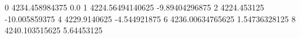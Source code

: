 0 4234.458984375 0.0
1 4224.56494140625 -9.89404296875
2 4224.453125 -10.005859375
4 4229.9140625 -4.544921875
6 4236.00634765625 1.54736328125
8 4240.103515625 5.64453125
